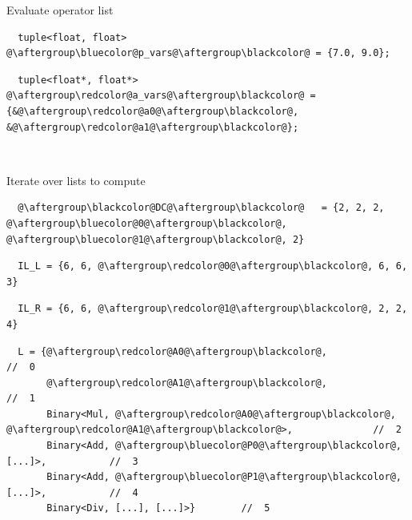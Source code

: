 \documentclass[xcolor=dvipsnames]{beamer}
\begin{document}
\begin{frame}[fragile]{Evaluate operator list}
\begin{lstlisting}
  tuple<float, float>   @\aftergroup\bluecolor@p_vars@\aftergroup\blackcolor@ = {7.0, 9.0};
\end{lstlisting}
\begin{lstlisting}
  tuple<float*, float*> @\aftergroup\redcolor@a_vars@\aftergroup\blackcolor@ = {&@\aftergroup\redcolor@a0@\aftergroup\blackcolor@, &@\aftergroup\redcolor@a1@\aftergroup\blackcolor@};
\end{lstlisting}

~

Iterate over lists to compute
\begin{lstlisting}
  @\aftergroup\blackcolor@DC@\aftergroup\blackcolor@   = {2, 2, 2, @\aftergroup\bluecolor@0@\aftergroup\blackcolor@, @\aftergroup\bluecolor@1@\aftergroup\blackcolor@, 2}
\end{lstlisting}
\begin{lstlisting}
  IL_L = {6, 6, @\aftergroup\redcolor@0@\aftergroup\blackcolor@, 6, 6, 3}
\end{lstlisting}
\begin{lstlisting}
  IL_R = {6, 6, @\aftergroup\redcolor@1@\aftergroup\blackcolor@, 2, 2, 4}
\end{lstlisting}

\begin{lstlisting}
  L = {@\aftergroup\redcolor@A0@\aftergroup\blackcolor@,                               //  0
       @\aftergroup\redcolor@A1@\aftergroup\blackcolor@,                               //  1
       Binary<Mul, @\aftergroup\redcolor@A0@\aftergroup\blackcolor@, @\aftergroup\redcolor@A1@\aftergroup\blackcolor@>,              //  2
       Binary<Add, @\aftergroup\bluecolor@P0@\aftergroup\blackcolor@, [...]>,           //  3
       Binary<Add, @\aftergroup\bluecolor@P1@\aftergroup\blackcolor@, [...]>,           //  4
       Binary<Div, [...], [...]>}        //  5
\end{lstlisting}
\end{frame}
\end{document}
